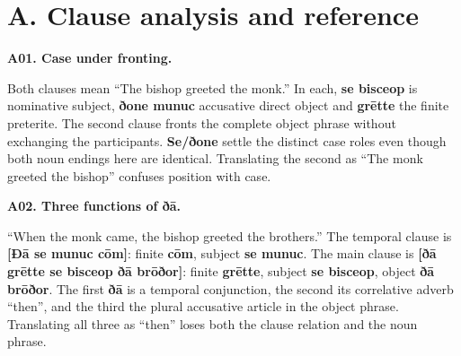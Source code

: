 \section*{A. Clause analysis and reference}

\par\begin{minipage}{\linewidth}\raggedright
\textbf{A01. Case under fronting.}

Both clauses mean “The bishop greeted the monk.” In each, \textbf{se bisceop} is nominative subject, \textbf{ðone munuc} accusative direct object and \textbf{grētte} the finite preterite. The second clause fronts the complete object phrase without exchanging the participants. \textbf{Se/\allowbreak{}ðone} settle the distinct case roles even though both noun endings here are identical. Translating the second as “The monk greeted the bishop” confuses position with case.

\end{minipage}\par\addvspace{4pt}

\par\begin{minipage}{\linewidth}\raggedright
\textbf{A02. Three functions of ðā.}

“When the monk came, the bishop greeted the brothers.” The temporal clause is \textbf{[Ðā se munuc cōm]}: finite \textbf{cōm}, subject \textbf{se munuc}. The main clause is \textbf{[ðā grētte se bisceop ðā brōðor]}: finite \textbf{grētte}, subject \textbf{se bisceop}, object \textbf{ðā brōðor}. The first \textbf{ðā} is a temporal conjunction, the second its correlative adverb “then”, and the third the plural accusative article in the object phrase. Translating all three as “then” loses both the clause relation and the noun phrase.

\end{minipage}\par\addvspace{4pt}

